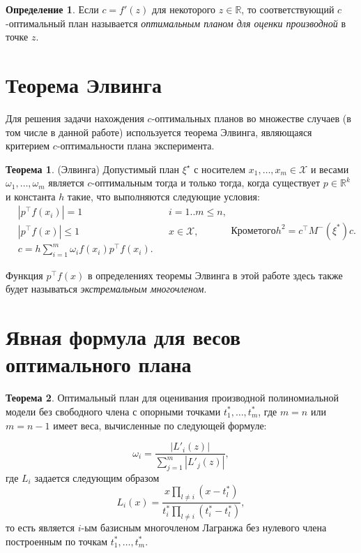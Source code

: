 \documentclass[specialist,
               substylefile = spbu.rtx,
               subf,href,colorlinks=true, 12pt]{disser}
\theoremstyle{definition}
\newtheorem{definition}{Определение}
\newtheorem{theorem}{Теорема}
\newcommand\abs[1]{\left\lvert#1\right\rvert}
\begin{document}
  \begin{definition}
  Если $c = f'(z)$ для некоторого $z \in \mathbb{R}$, то соответствующий $c$-оп\-ти\-маль\-ный план называется \textit{оптимальным планом для оценки производной} в точке $z$.
  \end{definition}
  
  \section{Теорема Элвинга}
  
  Для решения задачи нахождения $c$-оптимальных планов во множестве случаев (в том числе в данной работе) используется теорема Элвинга, являющаяся критерием $c$-оптимальности плана эксперимента.
  \begin{theorem}
  \label{th:elfving}
  (Элвинга) \cite{melas2010}
  Допустимый план $\xi^\star$ с носителем $x_1, \ldots, x_m \in \mathcal{X}$ и весами $\omega_1, \ldots, \omega_m$ является $c$-оптимальным тогда и только тогда, когда существует $p \in \mathbb{R}^k$ и константа $h$ такие, что выполняются следующие условия:
  \begin{subequations}
  \label{eq:elfving}
  \begin{align}
	&\abs{p^\top f(x_i)} = 1 &&i=1..m \leqslant n \label{eq:elfving:eq1} ,\\
	&\abs{p^\top f(x)} \leqslant 1  &&x \in \mathcal{X} \label{eq:elfving:eq2} ,\\
	&c = h \sum_{i=1}^m \omega_i f(x_i) p^\top f(x_i) \label{eq:elfving:eq3}.
  \end{align}
  Кроме того
  \begin{equation*}
  	h^2 = c^\top M^{-}(\xi^{*})c.
  \end{equation*}
  \end{subequations}
  \end{theorem}
	Функция $p^\top f(x)$ в определениях теоремы Элвинга в этой работе здесь также будет называться \textit{экстремальным многочленом}.
	
	\section{Явная формула для весов оптимального плана}
	
	\begin{theorem} \cite{melasmain}
	\label{th:weights}
	Оптимальный план для оценивания производной полиномиальной модели без свободного члена с опорными точками $t_1^*, \ldots, t_m^*$, где $m=n$ или $m=n-1$ имеет веса, вычисленные по следующей формуле:	
	
	\begin{equation}
	\label{eq:weights}
		\omega_i = \frac{\abs{L'_i(z)}}{\sum_{j=1}^m \abs{L'_j(z)}},
	\end{equation}
	где $L_i$ задается следующим образом
	\begin{equation}
		\label{eq:lagr}
		L_{i}(x) = \frac{x \prod_{l \neq i} (x - t_l^*)}{t_i^* \prod_{l \neq i} (t_i^* - t_l^*)},
	\end{equation}	
	то есть является $i$-ым базисным многочленом Лагранжа без нулевого члена построенным по точкам $t_1^*, \ldots, t_m^*$.
	\end{theorem}
	
\end{document}
